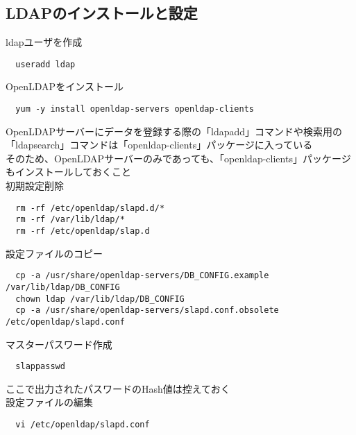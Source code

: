 \subsection{LDAPのインストールと設定}
ldapユーザを作成
\begin{verbatim}
  useradd ldap
\end{verbatim}
OpenLDAPをインストール
\begin{verbatim}
  yum -y install openldap-servers openldap-clients
\end{verbatim}
OpenLDAPサーバーにデータを登録する際の「ldapadd」コマンドや検索用の「ldapsearch」コマンドは「openldap-clients」パッケージに入っている\\
そのため、OpenLDAPサーバーのみであっても、「openldap-clients」パッケージもインストールしておくこと\\
\newline
初期設定削除
\begin{verbatim}
  rm -rf /etc/openldap/slapd.d/*
  rm -rf /var/lib/ldap/*
  rm -rf /etc/openldap/slap.d
\end{verbatim}
設定ファイルのコピー
\begin{verbatim}
  cp -a /usr/share/openldap-servers/DB_CONFIG.example /var/lib/ldap/DB_CONFIG
  chown ldap /var/lib/ldap/DB_CONFIG
  cp -a /usr/share/openldap-servers/slapd.conf.obsolete /etc/openldap/slapd.conf
\end{verbatim}
マスターパスワード作成
\begin{verbatim}
  slappasswd
\end{verbatim}
ここで出力されたパスワードのHash値は控えておく\\
設定ファイルの編集
\begin{verbatim}
  vi /etc/openldap/slapd.conf 
\end{verbatim}
